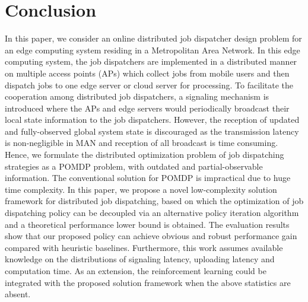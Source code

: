 \section{Conclusion}
\label{sec:conclusion}
In this paper, we consider an online distributed job dispatcher design problem for an edge computing system residing in a Metropolitan Area Network.
In this edge computing system, the job dispatchers are implemented in a distributed manner on multiple access points (APs) which collect jobs from mobile users and then dispatch jobs to one edge server or cloud server for processing.
To facilitate the cooperation among distributed job dispatchers, a signaling mechanism is introduced where the APs and edge servers would periodically broadcast their local state information to the job dispatchers.
However, the reception of updated and fully-observed global system state is discouraged as the transmission latency is non-negligible in MAN and reception of all broadcast is time consuming.
Hence, we formulate the distributed optimization problem of job dispatching strategies as a POMDP problem, with outdated and partial-observable information.
The conventional solution for POMDP is impractical due to huge time complexity.
In this paper, we propose a novel low-complexity solution framework for distributed job dispatching, based on which the optimization of job dispatching policy can be decoupled via an alternative policy iteration algorithm and a theoretical performance lower bound is obtained.
The evaluation results show that our proposed policy can achieve obvious and robust performance gain compared with heuristic baselines.
Furthermore, this work assumes available knowledge on the distributions of signaling latency, uploading latency and computation time.
As an extension, the reinforcement learning could be integrated with the proposed solution framework when the above statistics are absent.

